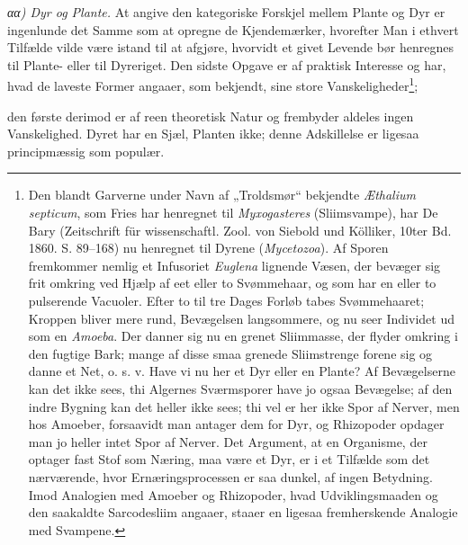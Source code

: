 \documentclass[12pt,a4paper]{book}
\begin{document}
\emph{αα) Dyr og Plante.} At angive den kategoriske Forskjel mellem Plante og
Dyr er ingenlunde det Samme som at opregne de Kjendemærker, hvorefter Man i
ethvert Tilfælde vilde være istand til at afgjøre, hvorvidt et givet Levende
bør henregnes til Plante- eller til Dyreriget. Den sidste Opgave er af praktisk
Interesse og har, hvad de laveste Former angaaer, som bekjendt, sine store
Vanskeligheder\footnote{Den blandt Garverne under Navn af „Troldsmør“ bekjendte
\textit{Æthalium septicum}, som Fries har henregnet til \textit{Myxogasteres}
(Sliimsvampe), har De Bary (Zeitschrift für wissenschaftl. Zool. von Siebold
und Kölliker, 10ter Bd. 1860. S. 89--168) nu henregnet til Dyrene
(\textit{Mycetozoa}). Af Sporen fremkommer nemlig et Infusoriet
\textit{Euglena} lignende Væsen, der bevæger sig frit omkring ved Hjælp af eet
eller to Svømmehaar, og som har en eller to pulserende Vacuoler. Efter to til
tre Dages Forløb tabes Svømmehaaret; Kroppen bliver mere rund, Bevægelsen
langsommere, og nu seer Individet ud som en \textit{Amoeba}. Der danner sig nu
en grenet Sliimmasse, der flyder omkring i den fugtige Bark; mange af disse
smaa grenede Sliimstrenge forene sig og danne et Net, o. s. v. Have vi nu her
et Dyr eller en Plante? Af Bevægelserne kan det ikke sees, thi Algernes
Sværmsporer have jo ogsaa Bevægelse; af den indre Bygning kan det heller ikke
sees; thi vel er her ikke Spor af Nerver, men hos Amoeber, forsaavidt man
antager dem for Dyr, og Rhizopoder opdager man jo heller intet Spor af Nerver.
Det Argument, at en Organisme, der optager fast Stof som Næring, maa være et
Dyr, er i et Tilfælde som det nærværende, hvor Ernæringsprocessen er saa
dunkel, af ingen Betydning. Imod Analogien med Amoeber og Rhizopoder, hvad
Udviklingsmaaden og den saakaldte Sarcodesliim angaaer, staaer en ligesaa
fremherskende Analogie med Svampene.};

\setcounter{footnote}{0}
den første derimod er af reen theoretisk Natur og frembyder aldeles ingen
Vanskelighed. Dyret har en Sjæl, Planten ikke; denne Adskillelse er ligesaa
principmæssig som populær.
\end{document}
